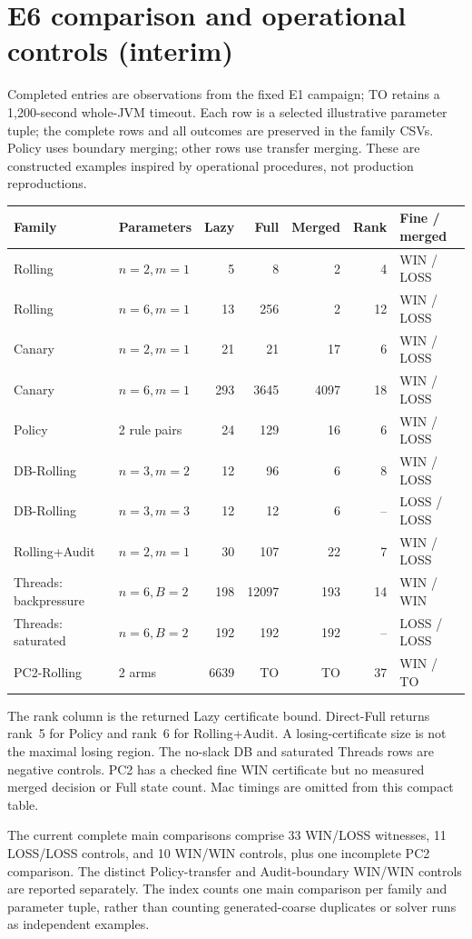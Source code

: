 \documentclass[10pt]{article}
\begin{document}
\section*{E6 comparison and operational controls (interim)}
Completed entries are observations from the fixed E1 campaign; TO retains a 1,200-second whole-JVM timeout. Each row is a selected illustrative parameter tuple; the complete rows and all outcomes are preserved in the family CSVs. Policy uses boundary merging; other rows use transfer merging. These are constructed examples inspired by operational procedures, not production reproductions.

\bigskip
\noindent
\begin{tabular}{llrrrrl}
\toprule
Family & Parameters & Lazy & Full & Merged & Rank & Fine / merged \\
\midrule
Rolling & $n=2,m=1$ & 5 & 8 & 2 & 4 & WIN / LOSS \\
Rolling & $n=6,m=1$ & 13 & 256 & 2 & 12 & WIN / LOSS \\
Canary & $n=2,m=1$ & 21 & 21 & 17 & 6 & WIN / LOSS \\
Canary & $n=6,m=1$ & 293 & 3645 & 4097 & 18 & WIN / LOSS \\
Policy & 2 rule pairs & 24 & 129 & 16 & 6 & WIN / LOSS \\
DB-Rolling & $n=3,m=2$ & 12 & 96 & 6 & 8 & WIN / LOSS \\
DB-Rolling & $n=3,m=3$ & 12 & 12 & 6 & -- & LOSS / LOSS \\
Rolling+Audit & $n=2,m=1$ & 30 & 107 & 22 & 7 & WIN / LOSS \\
Threads: backpressure & $n=6,B=2$ & 198 & 12097 & 193 & 14 & WIN / WIN \\
Threads: saturated & $n=6,B=2$ & 192 & 192 & 192 & -- & LOSS / LOSS \\
PC2-Rolling & 2 arms & 6639 & TO & TO & 37 & WIN / TO \\
\bottomrule
\end{tabular}

\bigskip
The rank column is the returned Lazy certificate bound. Direct-Full returns rank~5 for Policy and rank~6 for Rolling+Audit. A losing-certificate size is not the maximal losing region. The no-slack DB and saturated Threads rows are negative controls. PC2 has a checked fine WIN certificate but no measured merged decision or Full state count. Mac timings are omitted from this compact table.

\medskip
The current complete main comparisons comprise 33 WIN/LOSS witnesses, 11 LOSS/LOSS controls, and 10 WIN/WIN controls, plus one incomplete PC2 comparison. The distinct Policy-transfer and Audit-boundary WIN/WIN controls are reported separately. The index counts one main comparison per family and parameter tuple, rather than counting generated-coarse duplicates or solver runs as independent examples.
\end{document}
